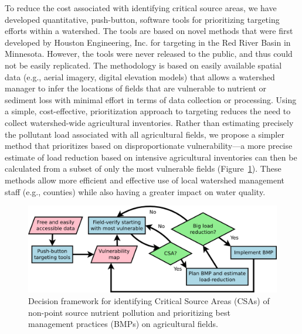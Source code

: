 \documentclass[12pt]{article}
\begin{document}
To reduce the cost associated with identifying critical source areas, we have developed quantitative, push-button, software tools for prioritizing targeting efforts within a watershed. The tools are based on novel methods that were first developed by Houston Engineering, Inc. for targeting in the Red River Basin in Minnesota. However, the tools were never released to the public, and thus could not be easily replicated. The methodology is based on easily available spatial data (e.g., aerial imagery, digital elevation models) that allows a watershed manager to infer the locations of fields that are vulnerable to nutrient or sediment loss with minimal effort in terms of data collection or processing. Using a simple, cost-effective, prioritization approach to targeting reduces the need to collect watershed-wide agricultural inventories. Rather than estimating precisely the pollutant load associated with all agricultural fields, we propose a simpler method that prioritizes based on disproportionate vulnerability---a more precise estimate of load reduction based on intensive agricultural inventories can then be calculated from a subset of only the most vulnerable fields (Figure~\ref{decisionFramework}). These methods allow more efficient and effective use of local watershed management staff (e.g., counties) while also having a greater impact on water quality.

\begin{figure}
  \centering
    \includegraphics[width=\textwidth]{decisionFramework}
  \caption{Decision framework for identifying Critical Source Areas (CSAs) of non-point source nutrient pollution and prioritizing best management practices (BMPs) on agricultural fields.}
  \label{decisionFramework}
\end{figure}
\end{document}
